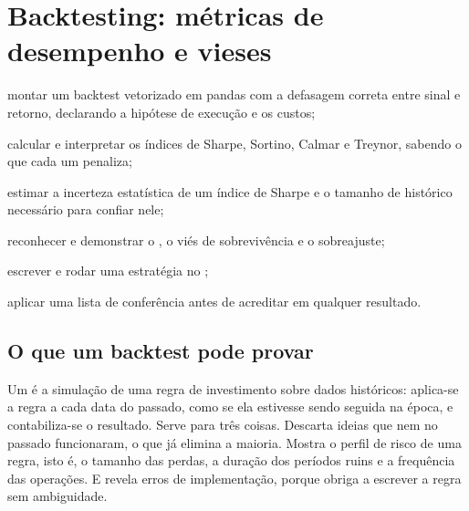 \chapter{Backtesting: métricas de desempenho e vieses}
\label{cap:backtest}


\begin{objetivos}
  \item montar um backtest vetorizado em pandas com a defasagem correta entre sinal e retorno, declarando a hipótese de execução e os custos;
  \item calcular e interpretar os índices de Sharpe, Sortino, Calmar e Treynor, sabendo o que cada um penaliza;
  \item estimar a incerteza estatística de um índice de Sharpe e o tamanho de histórico necessário para confiar nele;
  \item reconhecer e demonstrar o , o viés de sobrevivência e o sobreajuste;
  \item escrever e rodar uma estratégia no ;
  \item aplicar uma lista de conferência antes de acreditar em qualquer resultado.
\end{objetivos}

\section{O que um backtest pode provar}
\label{sec:c10-oque}

Um  é a simulação de uma regra de investimento sobre dados históricos: aplica-se a regra a cada data do passado, como se ela estivesse sendo seguida na época, e contabiliza-se o resultado. Serve para três coisas. Descarta ideias que nem no passado funcionaram, o que já elimina a maioria. Mostra o perfil de risco de uma regra, isto é, o tamanho das perdas, a duração dos períodos ruins e a frequência das operações. E revela erros de implementação, porque obriga a escrever a regra sem ambiguidade.

